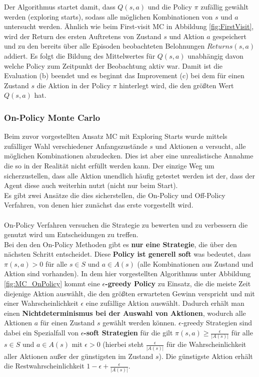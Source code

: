 \documentclass[10pt]{scrartcl}
\begin{document}
Der Algorithmus startet damit, dass $Q(s,a)$ und die Policy $\pi$ zufällig gewählt werden (exploring starts), sodass alle möglichen Kombinationen von $s$ und $a$ untersucht werden. Ähnlich wie beim First-visit MC in Abbildung \ref{fig:FirstVisit}, wird der Return des ersten Auftretens von Zustand $s$ und Aktion $a$ gespeichert und zu den bereits über alle Episoden beobachteten Belohnungen $Returns(s,a)$ addiert. Es folgt die Bildung des Mittelwertes für $Q(s,a)$ unabhängig davon welche Policy zum Zeitpunkt der Beobachtung aktiv war. Damit ist die Evaluation (b) beendet und es beginnt das Improvement (c) bei dem für einen Zustand $s$ die Aktion in der Policy $\pi$ hinterlegt wird, die den größten Wert $Q(s,a)$ hat.\\


\subsubsection{On-Policy Monte Carlo}
Beim zuvor vorgestellten Ansatz \glqq MC mit Exploring Starts\grqq\xspace wurde mittels zufälliger Wahl verschiedener Anfangszustände $s$ und Aktionen $a$ versucht, alle möglichen Kombinationen abzudecken. Dies ist aber eine unrealistische Annahme die so in der Realität nicht erfüllt werden kann. Der einzige Weg um sicherzustellen, dass alle Aktion unendlich häufig getestet werden ist der, dass der Agent diese auch weiterhin nutzt (nicht nur beim Start).\\
Es gibt zwei Ansätze die dies sicherstellen, die On-Policy und Off-Policy Verfahren, von denen hier zunächst das erste vorgestellt wird.\\
\\
On-Policy Verfahren versuchen die Strategie zu bewerten und zu verbessern die genutzt wird um Entscheidungen zu treffen.\\
Bei den den On-Policy Methoden gibt es \textbf{nur eine Strategie}, die über den nächsten Schritt entscheidet. Diese \textbf{Policy ist generell soft} was bedeutet, dass $\pi(s,a) > 0$ für alle $s \in S$ und $a \in A(s)$ (alle Kombinationen aus Zustand und Aktion sind vorhanden). In dem hier vorgestellten Algorithmus unter Abbildung \ref{fig:MC_OnPolicy} kommt eine \textbf{$\epsilon$-greedy Policy} zu Einsatz, die die meiste Zeit diejenige Aktion auswählt, die den größten erwarteten Gewinn verspricht und mit einer Wahrscheinlichkeit $\epsilon$ eine zufällige Aktion auswählt. Dadurch erhält man einen \textbf{Nichtdeterminismus bei der Auswahl von Aktionen}, wodurch alle Aktionen $a$ für einen Zustand $s$ gewählt werden können. $\epsilon$-greedy Strategien sind dabei ein Spezialfall von \textbf{$\epsilon$-soft Strategien} für die gilt $\pi(s,a) \geq \frac{\epsilon}{|A(s)|}$ für alle $s \in S$ und $a \in A(s)$ mit $\epsilon > 0$ (hierbei steht $\frac{\epsilon}{|A(s)|}$ für die Wahrscheinlichkeit aller Aktionen außer der günstigsten im Zustand $s$). Die günstigste Aktion erhält die Restwahrscheinlichkeit $1-\epsilon + \frac{\epsilon}{|A(s)|}$.\\
\end{document}
